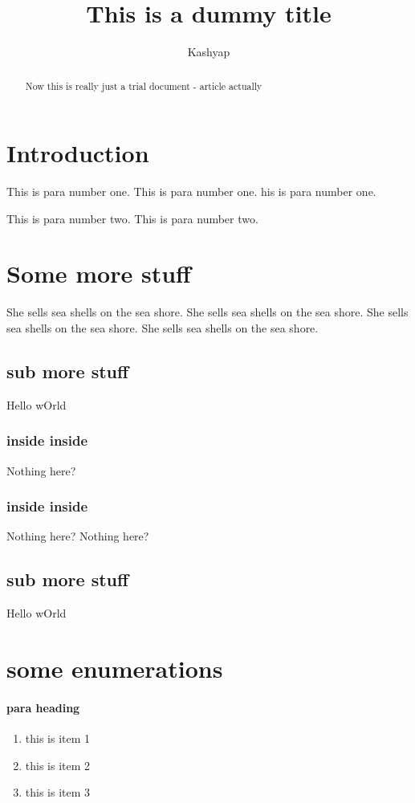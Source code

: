 \documentclass [a4paper,12pt] {article}
\begin{document}
\title{This is a dummy title}
\author{Kashyap}
\maketitle

\begin{abstract}
Now this is really just a trial document - article actually
\end{abstract}


\section{Introduction}

This is para number one.
This is para number one.
his is para number one.

This is para number two.
This is para number two.

\section{Some more stuff}
She sells sea shells on the sea shore.
She sells sea shells on the sea shore.
She sells sea shells on the sea shore.
She sells sea shells on the sea shore.

\subsection{sub more stuff}
Hello wOrld
\subsubsection{inside inside}

Nothing here?
\subsubsection{inside inside}

Nothing here?
Nothing here?

\subsection{sub more stuff}
Hello wOrld



\section{some enumerations}

\paragraph{para heading}
\begin{enumerate}
\item this is item 1
\item this is item 2
\item this is item 3
\end{enumerate}
\end{document}
